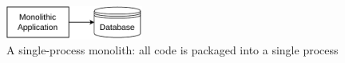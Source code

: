 \begin{figure}[!htbp]
    \centering
    \includegraphics[width=0.40\textwidth]{img/diagrams/pdf/single-process-monolith.drawio.pdf}
    \caption[Single-Process Monolith]{A single-process monolith: all code is packaged into a single process~\Parencite{newman2019monolith}}
    \label{fig:single-process-monolith}
\end{figure}
